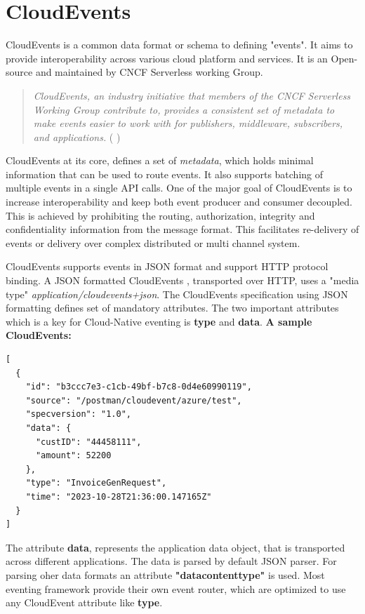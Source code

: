 \documentclass{article}
\begin{document}
\section{CloudEvents}
\begin{flushleft}
CloudEvents is a common data format or schema to defining "events". It aims to provide interoperability across various cloud platform and services. It is an Open-source and maintained by CNCF Serverless working Group.
\par
\begin{quote}
    \textit{CloudEvents, an industry initiative that members of the CNCF Serverless Working Group contribute to, provides a consistent set of metadata to make events easier to work with for publishers, middleware, subscribers, and applications.}
    \newline ( \cite{cncf_to_host_cloudevents_in_the_sandbox_2023} )
\end{quote}
\par
CloudEvents at its core, defines a set of \textit{metadata}, which holds minimal information that can be used to route events. It also supports batching of multiple events in a single API calls. One of the major goal of CloudEvents is to increase interoperability and keep both event producer and consumer decoupled. This is achieved by prohibiting the routing, authorization, integrity and confidentiality information from the message format. This facilitates re-delivery of events or delivery over complex distributed or multi channel system.
\par
CloudEvents supports events in JSON format and support HTTP protocol binding. A JSON formatted CloudEvents , transported over HTTP, uses a "media type" \textit{application/cloudevents+json}. The CloudEvents specification using JSON formatting defines set of mandatory attributes. The two important attributes which is a key for Cloud-Native eventing is \textbf{type} and \textbf{data}.
\newline
\textbf{A sample CloudEvents:} 
\begin{verbatim}
[
  {
    "id": "b3ccc7e3-c1cb-49bf-b7c8-0d4e60990119",
    "source": "/postman/cloudevent/azure/test",
    "specversion": "1.0",
    "data": {
      "custID": "44458111",
      "amount": 52200
    },
    "type": "InvoiceGenRequest",
    "time": "2023-10-28T21:36:00.147165Z"
  }
]
\end{verbatim}
The attribute \textbf{data}, represents the application data object, that is transported across different applications. The data is parsed by default JSON parser. For parsing oher data formats an attribute \textbf{"datacontenttype"} is used. Most eventing framework provide their own event router, which are optimized to use any CloudEvent attribute like \textbf{type}.

\end{flushleft}
\end{document}

